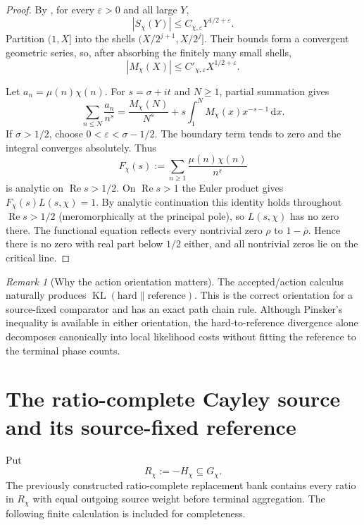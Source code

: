 \documentclass[11pt]{article}
\theoremstyle{definition}
\theoremstyle{remark}
\newtheorem{remark}[theorem]{Remark}
\newcommand{\KL}{\operatorname{KL}}
\newcommand{\dd}{\mathrm d}
\begin{document}
\begin{proof}
By , for every $\varepsilon>0$ and all
large $Y$,
\[
 |S_\chi(Y)|\le C_{\chi,\varepsilon}Y^{1/2+\varepsilon}.
\]
Partition $(1,X]$ into the shells
$(X/2^{j+1},X/2^j]$.  Their bounds form a convergent geometric series, so,
after absorbing the finitely many small shells,
\[
 |M_\chi(X)|
 \le C'_{\chi,\varepsilon}X^{1/2+\varepsilon}.
\]

Let $a_n=\mu(n)\chi(n)$.  For $s=\sigma+it$ and $N\ge1$, partial summation
gives
\[
 \sum_{n\le N}\frac{a_n}{n^s}
 =\frac{M_\chi(N)}{N^s}
  +s\int_1^NM_\chi(x)x^{-s-1}\,\dd x.
\]
If $\sigma>1/2$, choose
$0<\varepsilon<\sigma-1/2$.  The boundary term tends to zero and the integral
converges absolutely.  Thus
\[
 F_\chi(s):=\sum_{n\ge1}\frac{\mu(n)\chi(n)}{n^s}
\]
is analytic on $\operatorname{Re}s>1/2$.  On $\operatorname{Re}s>1$ the
Euler product gives $F_\chi(s)L(s,\chi)=1$.  By analytic continuation this
identity holds throughout $\operatorname{Re}s>1/2$ (meromorphically at the
principal pole), so $L(s,\chi)$ has no zero there.  The functional equation
reflects every nontrivial zero $\rho$ to $1-\overline\rho$.  Hence there is no
zero with real part below $1/2$ either, and all nontrivial zeros lie on the
critical line.
\end{proof}

\begin{remark}[Why the action orientation matters]
The accepted/action calculus naturally produces
$\KL(\text{hard}\|\text{reference})$.  This is the correct orientation for a
source-fixed comparator and has an exact path chain rule.  Although Pinsker's
inequality is available in either orientation, the hard-to-reference divergence
alone decomposes canonically into local likelihood costs without fitting the
reference to the terminal phase counts.
\end{remark}

\section{The ratio-complete Cayley source and its source-fixed reference}
\label{sec:Cayley-reference}

Put
\[
 R_\chi:=-H_\chi\subseteq G_\chi.
 \tag{3.1}
\]
The previously constructed ratio-complete replacement bank contains every ratio in
$R_\chi$ with equal outgoing source weight before terminal aggregation.  The
following finite calculation is included for completeness.
\end{document}

